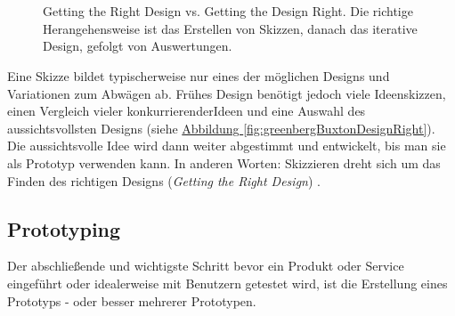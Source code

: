 \begin{figure}
	\myfloatalign
	 \\
	 \\
	\caption[Getting the Right Design vs. Getting the Design Right. \newline \citep{Greenberg:2008}]{Getting the Right Design vs. Getting the Design Right. Die richtige Herangehensweise ist das Erstellen von Skizzen, danach das iterative Design, gefolgt von Auswertungen.}\label{fig:greenbergBuxtonRightDesign}
\end{figure}

\medskip Eine Skizze bildet typischerweise nur eines der möglichen Designs und Variationen zum Abwägen ab. Frühes Design benötigt jedoch viele Ideenskizzen, einen Vergleich vieler konkurrierender\clearpage\noindent Ideen und eine Auswahl des aussichtsvollsten Designs (siehe \hyperref[fig:greenbergBuxtonDesignRight]{Abbildung \ref{fig:greenbergBuxtonDesignRight}}). Die aussichtsvolle Idee wird dann weiter abgestimmt und entwickelt, bis man sie als Prototyp verwenden kann. In anderen Worten: Skizzieren dreht sich um das Finden des richtigen Designs (\emph{Getting the Right Design}) \citep{Tohidi:2006, Buxton:2007, Greenberg:2008}. 

\subsection{Prototyping} 
Der abschließende und wichtigste Schritt bevor ein Produkt oder Service eingeführt oder idealerweise mit Benutzern getestet wird, ist die Erstellung eines Prototyps - oder besser mehrerer Prototypen.

